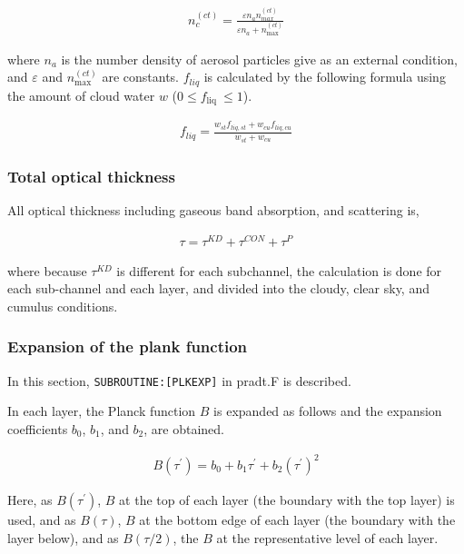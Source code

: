 \begin{eqnarray}
n_{c}^{(c t)}=\frac{\varepsilon n_{a} n_{m a x}^{(c t)}}{\varepsilon n_{a}+n_{\max }^{(c t)}}
\end{eqnarray}

where \(n_a\) is the number density of aerosol particles give as an external condition, and \(\varepsilon\) and \(n_{\max }^{(c t)}\) are constants. \(f_{liq}\) is calculated by the following formula
using the amount of cloud water \(w\) (\(0 \leq f_{\text {liq }} \leq 1\)).

\begin{eqnarray}
f_{l i q}=\frac{w_{s t} f_{l i q, s t}+w_{c u} f_{l i q, c u}}{w_{s t}+w_{c u}}
\end{eqnarray}

\hypertarget{total-optical-thickness}{%
\subsubsection{Total optical thickness}\label{total-optical-thickness}}

All optical thickness including gaseous band absorption, and scattering is,

\begin{eqnarray}
\tau=\tau^{K D}+\tau^{C O N}+\tau^{P}
\end{eqnarray}

where because \(\tau^{K D}\) is different for each subchannel, the calculation is done for each sub-channel and each layer, and divided into the cloudy, clear sky, and cumulus conditions.

\hypertarget{expansion-of-the-plank-function}{%
\subsubsection{Expansion of the plank function}\label{expansion-of-the-plank-function}}

In this section, \texttt{SUBROUTINE:{[}PLKEXP{]}} in pradt.F is described.

In each layer, the Planck function \(B\) is expanded as follows and the expansion coefficients \(b_0\), \(b_1\), and \(b_2\), are obtained.

\begin{eqnarray}
{B}\left(\tau^{\prime}\right)=b_{0}+b_{1} \tau^{\prime}+b_{2}\left(\tau^{\prime}\right)^{2}
\end{eqnarray}

Here, as \({B}\left(\tau^{\prime}\right)\), \(B\) at the top of each layer (the boundary with the top layer) is used, and as \({B}(\tau)\), \(B\) at the bottom edge of each layer (the boundary with
the layer below), and as \({B}(\tau / 2)\), the \(B\) at the representative level of each layer.

